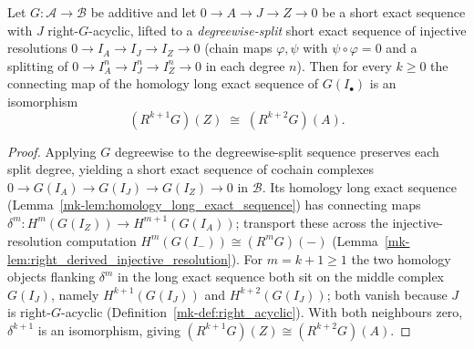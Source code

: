 \begin{lemma}
  \label{mk-lem:right_derived_shift_split_resolution}

  Let \(G : \mathcal{A} \to \mathcal{B}\) be additive and let
  \(0 \to A \to J \to Z \to 0\) be a short exact sequence with \(J\) right-\(G\)-acyclic,
  lifted to a \emph{degreewise-split} short exact sequence of injective resolutions
  \(0 \to I_A \to I_J \to I_Z \to 0\) (chain maps \(\varphi, \psi\) with
  \(\psi \circ \varphi = 0\) and a splitting of \(0 \to I_A^n \to I_J^n \to I_Z^n \to 0\)
  in each degree \(n\)). Then for every \(k \geq 0\) the connecting map of the homology
  long exact sequence of \(G(I_\bullet)\) is an isomorphism
  \[
    (R^{k+1} G)(Z) \;\cong\; (R^{k+2} G)(A).
  \]
\end{lemma}

\begin{proof}
  Applying \(G\) degreewise to the degreewise-split sequence preserves each split
  degree, yielding a short exact sequence of cochain complexes
  \(0 \to G(I_A) \to G(I_J) \to G(I_Z) \to 0\) in \(\mathcal{B}\). Its homology long
  exact sequence (Lemma~\ref{mk-lem:homology_long_exact_sequence}) has connecting maps
  \(\delta^m : H^m(G(I_Z)) \to H^{m+1}(G(I_A))\); transport these across the
  injective-resolution computation \(H^m(G(I_-)) \cong (R^m G)(-)\)
  (Lemma~\ref{mk-lem:right_derived_injective_resolution}). For \(m = k+1 \geq 1\) the two
  homology objects flanking \(\delta^m\) in the long exact sequence both sit on the
  middle complex \(G(I_J)\), namely \(H^{k+1}(G(I_J))\) and \(H^{k+2}(G(I_J))\); both
  vanish because \(J\) is right-\(G\)-acyclic (Definition~\ref{mk-def:right_acyclic}).
  With both neighbours zero, \(\delta^{k+1}\) is an isomorphism, giving
  \((R^{k+1} G)(Z) \cong (R^{k+2} G)(A)\).
\end{proof}

